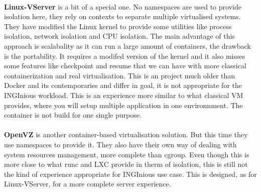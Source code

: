 \paragraph{}\textbf{Linux-VServer}\cite{linux-vserver} is a bit of a special one.  No namespaces are used to provide isolation here, they rely on contexts to separate multiple virtualised systems.  They have modified the Linux kernel to provide some utilities like process isolation, network isolation and CPU isolation.  The main advantage of this approach is scalabality as it can run a large amount of containers, the drawback is the portability.  It requires a modifed version of the kernel and it also misses some features like checkpoint and resume that we can have with more classical containerization and real virtualisation.  This is an project much older than Docker and its contemporaries and differ in goal, it is not appropriate for the INGInious workload.  This is an experience more similar to what classical VM provides, where you will setup multiple application in one environnment.  The container is not build for one single purpose.

\paragraph{}\textbf{OpenVZ}\cite{openvz} is another container-based virtualisation solution.  But this time they use namespaces to provide it.  They also have their own way of dealing with system resources management, more complete than cgroup.  Even though this is more close to what runc and LXC provide in therm of isolation, this is still not the kind of experience appropriate for INGInious use case.  This is designed, as for Linux-VServer, for a more complete server experience.


